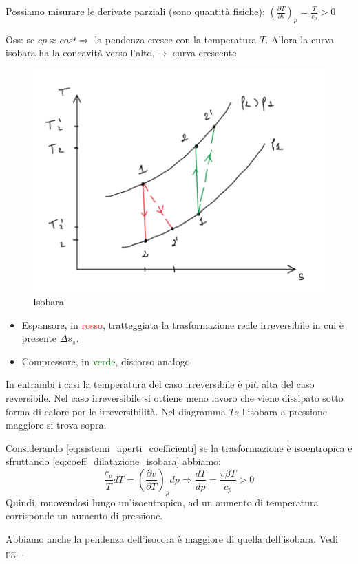 \documentclass[a4paper]{article}
\numberwithin{equation}{section}%
\begin{document}
Possiamo misurare le derivate parziali (sono quantità fisiche): $\left(\frac{\partial T}{\partial s}\right)_{p}=\frac{T}{c_{p}}>0$

Oss: se $cp\approx cost \Longrightarrow$ la pendenza cresce con la temperatura $T$.  Allora la curva isobara ha la concavità verso l’alto,$\rightarrow$ curva crescente

\begin{figure}[H]
	\begin{center}
		\includegraphics[width=0.4\columnwidth]{isobara_Ts.png}
		\caption{Isobara}
	\end{center}
\end{figure}

\begin{itemize}
	\item Espansore, in \textcolor{red}{rosso}, tratteggiata la trasformazione reale irreversibile in cui è presente $\Delta s_s$. 
	\item Compressore, in \textcolor{green}{verde}, discorso analogo
\end{itemize}
In entrambi i casi la temperatura del caso irreversibile è più alta del caso reversibile. Nel caso irreversibile si ottiene meno lavoro che viene dissipato sotto forma di calore per le irreversibilità. 
\newline
Nel diagramma $Ts$ l'isobara a pressione maggiore si trova sopra.

Considerando \eqref{eq:sistemi_aperti_coefficienti} se la trasformazione è isoentropica e  sfruttando \eqref{eq:coeff_dilatazione_isobara} abbiamo:
\begin{equation}
\frac{c_{p}}{T} d T=\left(\frac{\partial v}{\partial T}\right)_{p} d p \Rightarrow \frac{d T}{d p}=\frac{v \beta T}{c_{p}}>0
\end{equation}
 Quindi, muovendosi lungo un’isoentropica, ad un aumento di temperatura corrisponde un aumento di pressione.
 \newline
 
 Abbiamo anche la pendenza dell'isocora è maggiore di quella dell'isobara.
Vedi pg. \pageref{relazioni_cv_cp}.
\end{document}
